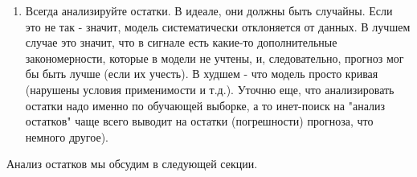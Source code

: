 \begin{enumerate}
    \item Всегда анализируйте остатки. В идеале, они должны быть
      случайны. Если это не так - значит, модель
      систематически отклоняется от данных. В лучшем случае это значит, что
      в сигнале есть какие-то дополнительные закономерности, которые в
      модели не учтены, и, следовательно, прогноз мог бы быть лучше (если
      их учесть). В худшем - что модель просто кривая (нарушены условия
      применимости и т.д.). Уточню еще, что анализировать остатки надо
      именно по обучающей выборке, а то инет-поиск на "анализ остатков"
    чаще всего выводит на остатки (погрешности) прогноза, что немного другое).
\end{enumerate}

Анализ остатков мы обсудим в следующей секции.

\printbibliography[heading=subbibliography, title={Источники}]
